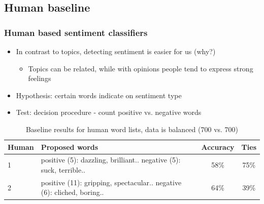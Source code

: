 \documentclass{beamer}
\begin{document}

\subsection{Human baseline}
\begin{frame}
	\frametitle{Human based sentiment classifiers}
	\begin{itemize}
		\item In contrast to topics, detecting sentiment is easier for us (why?)
		\begin{itemize}
		
		\item Topics can be related, while with opinions people tend to express strong feelings
		\end{itemize}
		
		\item Hypothesis: certain words indicate on sentiment type
		
		\item Test: decision procedure - count positive vs. negative words
	\end{itemize}
	
	\begin{table}
		\scriptsize
		\begin{tabular}{ l | p{5cm} | c | c }
			Human & Proposed words & Accuracy & Ties \footnotemark \\ \hline \hline
			1 & positive (5): dazzling, brilliant.. \newline negative (5): suck, terrible.. & 58\% & 75\% \\ \hline
			2 & positive (11): gripping, spectacular.. \newline negative (6): cliched, boring.. & 64\% & 39\%  \\  \hline
		\end{tabular}
		\caption{Baseline results for human word lists, data is balanced (700 vs. 700)}
	\end{table}
	
\end{frame}
\end{document}

